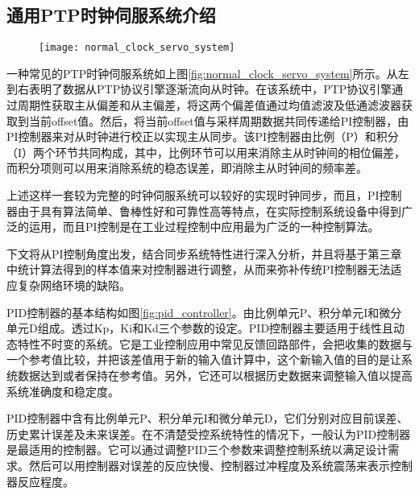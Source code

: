 \subsection{通用PTP时钟伺服系统介绍}
\begin{figure}[htbp]
  \centering
  \begin{minipage}[b]{0.7\textwidth}
   \captionstyle{\centering}
   \centering
   \texttt{[image: normal\_clock\_servo\_system]}
  \end{minipage}     
\end{figure}

一种常见的PTP时钟伺服系统如上图\ref{fig:normal_clock_servo_system}所示\supercite{58}。从左到右表明了数据从PTP协议引擎逐渐流向从时钟。在该系统中，PTP协议引擎通过周期性获取主从偏差和从主偏差，将这两个偏差值通过均值滤波及低通滤波器获取到当前offset值。然后，将当前offset值与采样周期数据共同传递给PI控制器，由PI控制器来对从时钟进行校正以实现主从同步。该PI控制器由比例（P）和积分（I）两个环节共同构成，其中，比例环节可以用来消除主从时钟间的相位偏差，而积分项则可以用来消除系统的稳态误差，即消除主从时钟间的频率差\supercite{58}。

上述这样一套较为完整的时钟伺服系统可以较好的实现时钟同步，而且，PI控制器由于具有算法简单、鲁棒性好和可靠性高等特点，在实际控制系统设备中得到广泛的运用，而且PI控制是在工业过程控制中应用最为广泛的一种控制算法。

下文将从PI控制角度出发，结合同步系统特性进行深入分析，并且将基于第三章中统计算法得到的样本值来对控制器进行调整，从而来弥补传统PI控制器无法适应复杂网络环境的缺陷。

PID控制器的基本结构如图\ref{fig:pid_controller}。由比例单元P、积分单元I和微分单元D组成。透过Kp，Ki和Kd三个参数的设定。PID控制器主要适用于线性且动态特性不时变的系统。它是工业控制应用中常见反馈回路部件，会把收集的数据与一个参考值比较，并把该差值用于新的输入值计算中，这个新输入值的目的是让系统数据达到或者保持在参考值。另外，它还可以根据历史数据来调整输入值以提高系统准确度和稳定度。

PID控制器中含有比例单元P、积分单元I和微分单元D，它们分别对应目前误差、历史累计误差及未来误差。在不清楚受控系统特性的情况下，一般认为PID控制器是最适用的控制器。它可以通过调整PID三个参数来调整控制系统以满足设计需求。然后可以用控制器对误差的反应快慢、控制器过冲程度及系统震荡来表示控制器反应程度。


